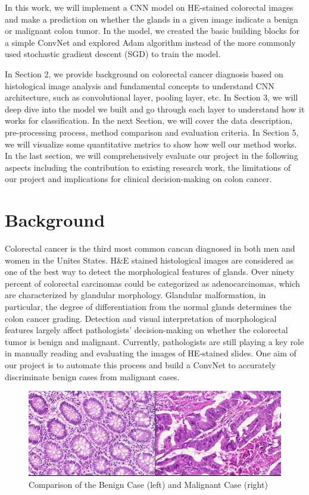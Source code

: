 \documentclass[twoside,11pt]{article}
\begin{document}
In this work, we will implement a CNN model on HE-stained colorectal images and make a prediction on whether the glands in a given image indicate a benign or malignant colon tumor. In the model, we created the basic building blocks for a simple ConvNet and explored Adam algorithm instead of the more commonly used stochastic gradient descent (SGD) to train the model. 

In Section 2, we provide background on colorectal cancer diagnosis based on histological image analysis and fundamental concepts to understand CNN architecture, such as convolutional layer, pooling layer, etc. In Section 3, we will deep dive into the model we built and go through each layer to understand how it works for classification. In the next Section, we will cover the data description, pre-processing process, method comparison and evaluation criteria. In Section 5, we will visualize some quantitative metrics to show how well our method works. In the last section, we will comprehensively evaluate our project in the following aspects including the contribution to existing research work, the limitations of our project and implications for clinical decision-making on colon cancer.

\section{Background} \label{background}
Colorectal cancer is the third most common cancan diagnosed in both men and women in the Unites States\citep{4}. H&E stained histological images are considered as one of the best way to detect the morphological features of glands. Over ninety percent of colorectal carcinomas could be categorized as adenocarcinomas, which are characterized by glandular morphology\citep{5}. Glandular malformation, in particular, the degree of differentiation from the normal glands determines the colon cancer grading. Detection and visual interpretation of morphological features largely affect pathologists' decision-making on whether the colorectal tumor is benign and malignant. Currently, pathologists are still playing a key role in manually reading and evaluating the images of HE-stained slides. One aim of our project is to automate this process and build a ConvNet to accurately discriminate benign cases from malignant cases. 

\begin{figure}[!h]
\centering
\includegraphics[width=.8\textwidth]{figure1.jpg}
\caption{Comparison of the Benign Case (left) and Malignant Case (right)}
\label{figure1}
\end{figure}
\end{document}

